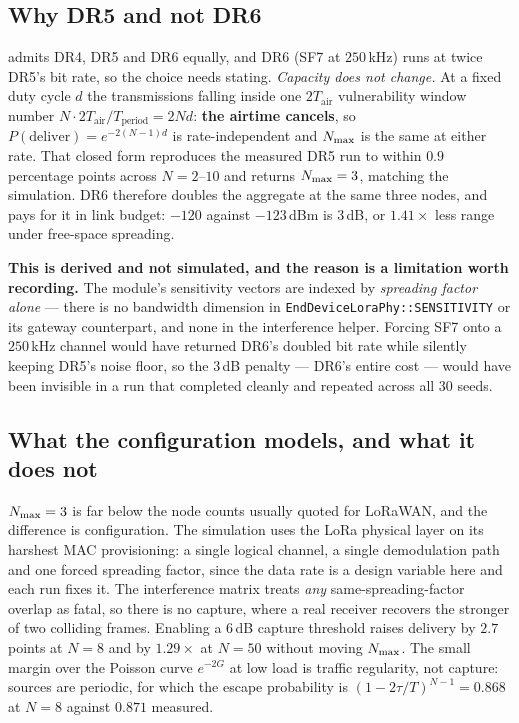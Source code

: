 \subsection{Why DR5 and not DR6}

 admits DR4, DR5 and DR6 equally, and DR6 (SF7 at $250$\,kHz) runs at twice DR5's bit
rate, so the choice needs stating. \emph{Capacity does not change.} At a fixed duty cycle $d$ the
transmissions falling inside one $2T_{\text{air}}$ vulnerability window number
$N \cdot 2T_{\text{air}}/T_{\text{period}} = 2Nd$: \textbf{the airtime cancels}, so
$P(\text{deliver}) = e^{-2(N-1)d}$ is rate-independent and $N_{\max}$ is the same at either rate.
That closed form reproduces the measured DR5 run to within $0.9$ percentage points across
$N{=}2$--$10$ and returns $N_{\max}=3$, matching the simulation. DR6 therefore doubles the aggregate
at the same three nodes, and pays for it in link budget: $-120$ against $-123$\,dBm is $3$\,dB,
or $1.41\times$ less range under free-space spreading.

\textbf{This is derived and not simulated, and the reason is a limitation worth recording.}
The module's sensitivity vectors are indexed by \emph{spreading factor alone} --- there is no
bandwidth dimension in \texttt{EndDeviceLoraPhy::SENSITIVITY} or its gateway counterpart, and
none in the interference helper. Forcing SF7 onto a $250$\,kHz channel would have returned DR6's
doubled bit rate while silently keeping DR5's noise floor, so the $3$\,dB penalty --- DR6's
entire cost --- would have been invisible in a run that completed cleanly and repeated across all
30 seeds.

\subsection{What the configuration models, and what it does not}

$N_{\max} = 3$ is far below the node counts usually quoted for LoRaWAN, and the difference is
configuration. The simulation uses the LoRa physical layer on its harshest MAC provisioning: a
single logical channel, a single demodulation path and one forced spreading factor, since the
data rate is a design variable here and each run fixes it. The interference matrix treats
\emph{any} same-spreading-factor overlap as fatal, so there is no capture, where a real receiver
recovers the stronger of two colliding frames. Enabling a $6$\,dB capture threshold raises
delivery by $2.7$ points at $N{=}8$ and by $1.29\times$ at $N{=}50$ without moving $N_{\max}$. The
small margin over the Poisson curve $e^{-2G}$ at low load is traffic regularity, not capture:
sources are periodic, for which the escape probability is $(1-2\tau/T)^{N-1} = 0.868$ at $N{=}8$
against $0.871$ measured.

